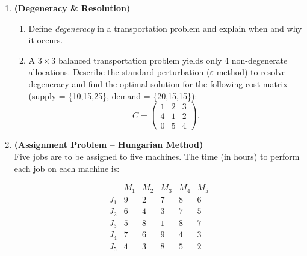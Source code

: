 \documentclass[12pt,a4paper]{article}
\begin{document}
\begin{enumerate}[leftmargin=*, label=\textbf{Q.\arabic*.}]
  \[
    \begin{array}{c|cccc|c}
               & D_1 & D_2 & D_3 & D_4 & \text{Supply}\\\hline
      O_1      & 3   & 1   & 7   & 4   & 300 \\
      O_2      & 2   & 6   & 5   & 9   & 400 \\
      O_3      & 8   & 3   & 3   & 2   & 500 \\\hline
      \text{Demand} & 250 & 350 & 400 & 200 &
    \end{array}
  \]

\item \textbf{(Degeneracy \& Resolution)}\\
  \begin{enumerate}[label=(\alph*)]
    \item Define \textit{degeneracy} in a transportation problem and explain
          when and why it occurs.
    \item A $3 \times 3$ balanced transportation problem yields only 4
          non-degenerate allocations.  Describe the standard perturbation
          ($\varepsilon$-method) to resolve degeneracy and find the optimal
          solution for the following cost matrix (supply = \{10,15,25\},
          demand = \{20,15,15\}):
    \[
      C = \begin{pmatrix} 1 & 2 & 3 \\ 4 & 1 & 2 \\ 0 & 5 & 4 \end{pmatrix}.
    \]
  \end{enumerate}

\item \textbf{(Assignment Problem -- Hungarian Method)}\\
  Five jobs are to be assigned to five machines.  The time (in hours) to
  perform each job on each machine is:

  \[
    \begin{array}{c|ccccc}
      & M_1 & M_2 & M_3 & M_4 & M_5\\\hline
      J_1 & 9  & 2  & 7  & 8  & 6 \\
      J_2 & 6  & 4  & 3  & 7  & 5 \\
      J_3 & 5  & 8  & 1  & 8  & 7 \\
      J_4 & 7  & 6  & 9  & 4  & 3 \\
      J_5 & 4  & 3  & 8  & 5  & 2 \\
    \end{array}
  \]


\end{enumerate}
\end{document}
